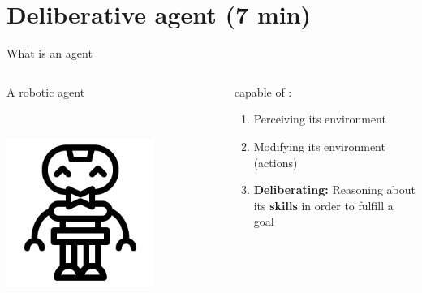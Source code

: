\section{Deliberative agent (7 min)}

\begin{frame}{What is an agent}

    \begin{columns}[T]
        \begin{column}{0.3\textwidth}
            A robotic agent

            ~

            \includegraphics[width = 0.7\textwidth]{images/icons8-robot-gustav-500.png}
        \end{column}
        \begin{column}{0.7\textwidth}
            \center capable of :
            \pause
            \begin{enumerate}
                \item Perceiving its environment
                \pause
                \item Modifying its environment (actions)
                \pause
                \item \textbf{Deliberating:} Reasoning about its \textbf{skills} in order to fulfill a goal
            \end{enumerate}
        \end{column}
    \end{columns}

 
\end{frame}

